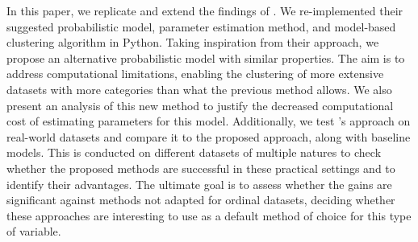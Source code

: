 In this paper, we replicate and extend the findings of \cite{biernacki2016model}. We re-implemented their suggested probabilistic model, parameter estimation method, and model-based clustering algorithm in Python. Taking inspiration from their approach, we propose an alternative probabilistic model with similar properties. The aim is to address computational limitations, enabling the clustering of more extensive datasets with more categories than what the previous method allows. We also present an analysis of this new method to justify the decreased computational cost of estimating parameters for this model. Additionally, we test \cite{biernacki2016model}'s approach on real-world datasets and compare it to the proposed approach, along with baseline models. This is conducted on different datasets of multiple natures to check whether the proposed methods are successful in these practical settings and to identify their advantages. The ultimate goal is to assess whether the gains are significant against methods not adapted for ordinal datasets, deciding whether these approaches are interesting to use as a default method of choice for this type of variable.


